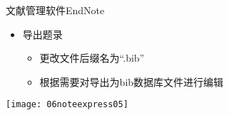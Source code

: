 \documentclass[fontset = none, t]{ctexbeamer}
\begin{document}
\begin{frame}[fragile]{文献管理软件}{EndNote}
  \begin{spacing}{1.2}
    \begin{itemize}
    \item 导出题录
      \begin{itemize}
      \item 更改文件后缀名为\enquote{.bib}
      \item 根据需要对导出为bib数据库文件进行编辑
      \end{itemize}
    \end{itemize}    
    \begin{center}
      \texttt{[image: 06noteexpress05]}
    \end{center}
  \end{spacing}
\end{frame}

\end{document}
